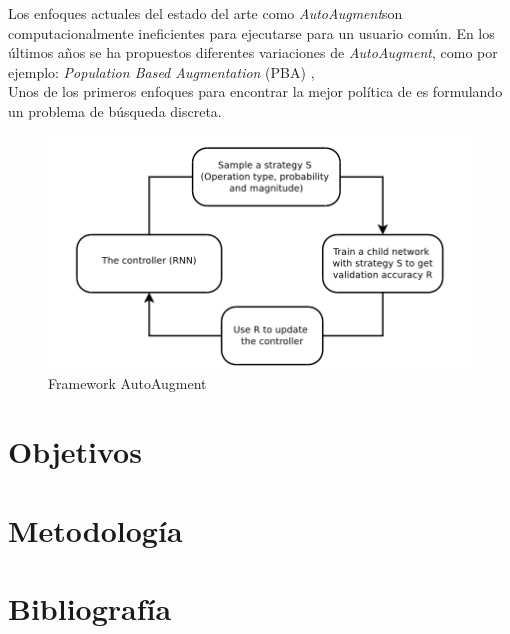 \documentclass[11pt,letterpaper]{article}
\newcommand{\AA}{\textit{AutoAugment}}
\begin{document}
Los enfoques actuales del estado del arte como \AA son computacionalmente ineficientes para ejecutarse para un usuario común. En los últimos años se ha propuestos diferentes variaciones de \AA, como por ejemplo: \textit{Population Based Augmentation} (PBA) \cite{populaion_based_augmentatio_3}, \\


Unos de los primeros enfoques para encontrar la mejor política de \ad es formulando un problema de búsqueda discreta.  
\begin{figure}[H]
    \centering
    \includegraphics[scale=0.5]{figure/enfoque_AutoAugment.png}
    \caption{Framework AutoAugment \cite{cubuk_autoaugment_4}}
    \label{fig:enfoque_AutoAugment}
\end{figure}


\section*{Objetivos}



\section*{Metodología}

\section*{Bibliografía}





\printbibliography
\end{document}
